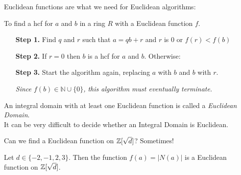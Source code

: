 Euclidean functions are what we need for Euclidean algorithms: \vspace*{5pt}\\
\begin{algorithm}To find a hcf for $a$ and $b$ in a ring $R$ with a Euclidean function $f$.\begin{itemize}
\item[\textbf{Step 1.}] Find $q$ and $r$ such that $a = qb + r$ and $r$ is $0$ or $f(r) < f(b)$
\item[\textbf{Step 2.}]	If $r = 0$ then $b$ is a hcf for $a$ and $b$. Otherwise:
\item[\textbf{Step 3.}] Start the algorithm again, replacing $a$ with $b$ and $b$ with $r$.

\textit{Since $f(b) \in \mathbb{N}\cup \{0\}$, this algorithm must eventually terminate.}
\end{itemize}
\end{algorithm}\vspace*{10pt}

\begin{definition} An integral domain with at least one Euclidean function is called a \emph{Euclidean Domain}.\vspace*{5pt}\\
It can be very difficult to decide whether an Integral Domain is Euclidean.
\end{definition}\vspace*{10pt}

Can we find a Euclidean function on $\mathbb{Z}[\sqrt{d}]$? Sometimes!\\

\begin{proposition} Let $d \in \{-2,-1,2,3\}.$ Then the function $f(a) = |N(a)|$ is a Euclidean function on $\mathbb{Z}[\sqrt{d}]$.	
\end{proposition}

